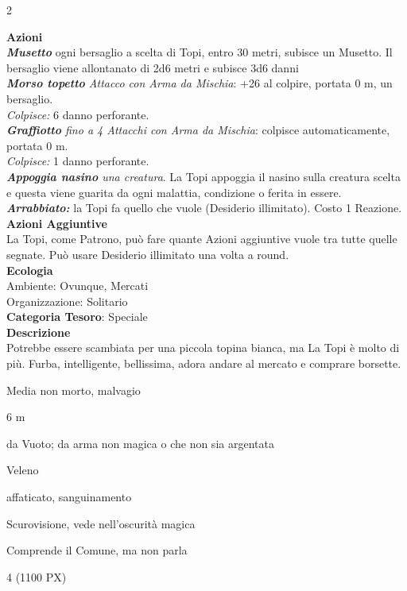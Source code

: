 \begin{multicols}{2}
{\textbf{Azioni}\\
\emph{\textbf{Musetto}} ogni bersaglio a scelta di Topi, entro 30 metri, subisce un Musetto. Il bersaglio viene allontanato di 2d6 metri e subisce 3d6 danni\\
\emph{\textbf{Morso topetto} Attacco con Arma da Mischia}: +26 al colpire, portata 0 m, un bersaglio.\\
\emph{Colpisce:} 6 danno perforante.\\
\emph{\textbf{Graffiotto} fino a 4 Attacchi con Arma da Mischia}: colpisce  automaticamente, portata 0 m.\\
\emph{Colpisce:} 1 danno perforante.\\
\emph{\textbf{Appoggia nasino} una creatura}. La Topi appoggia il nasino sulla creatura scelta e questa viene guarita da ogni malattia, condizione o ferita in essere.\\
\emph{\textbf{Arrabbiato:}} la Topi fa quello che vuole (Desiderio illimitato). Costo 1 Reazione.\\
\textbf{Azioni Aggiuntive}\\
La Topi, come Patrono, può fare quante Azioni aggiuntive vuole tra tutte quelle segnate. Può usare Desiderio illimitato una volta a round.\\
\textbf{Ecologia}\\
Ambiente: Ovunque, Mercati\\
Organizzazione: Solitario\\
\textbf{Categoria Tesoro}: Speciale\\
\textbf{Descrizione}\\
Potrebbe essere scambiata per una piccola topina bianca, ma La Topi è molto di più. Furba, intelligente, bellissima, adora andare al mercato e comprare borsette.


\begin{description}[noitemsep, topsep=0pt, parsep=0pt, partopsep=0pt, itemsep=1pt, leftmargin=2.35cm,  labelwidth=2.2cm, itemindent=0cm, listparindent=0pt] %
\setlength{\baselineskip}{10pt}
\item[\textbf{Taglia/Tipo}] Media non morto, malvagio
\item[\textbf{Caratt.}] 
\item[\textbf{Punti Ferita}] 
\item[\textbf{Movimento}] 6 m
\item[\textbf{Tiri Salvez.}] 
\item[\textbf{Res. Danni}] da Vuoto; da arma non magica o che non sia argentata
\item[\textbf{Imm. Danni}] Veleno
\item[\textbf{Immunità}] affaticato, sanguinamento
\item[\textbf{Sensi}] Scurovisione, vede nell'oscurità magica
\item[\textbf{Linguaggi}] Comprende il Comune, ma non parla
\item[\textbf{Sfida}] 4 (1100 PX)
\end{description}
\smallskip

}
\end{multicols}
